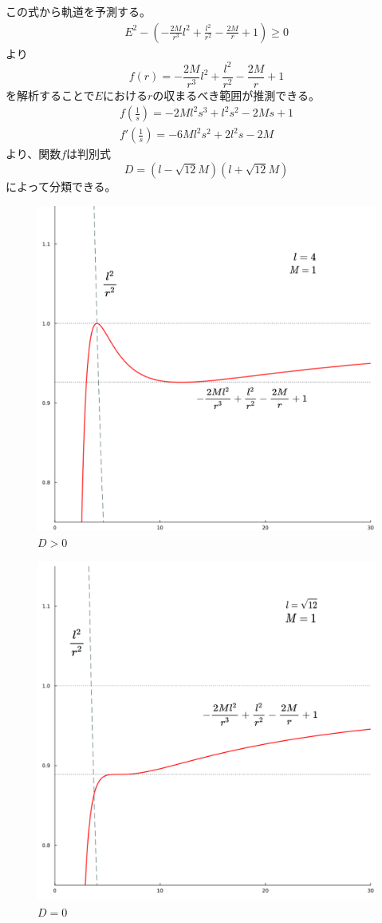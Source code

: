 \documentclass[dvipdfmx]{report} %
\begin{document}
\noindent
この式から軌道を予測する。\\
\begin{equation*}
\begin{split}
E^2 - \left( - \frac{2M}{r^3} l^2 + \frac{l^2}{r^2} - \frac{2M}{r} + 1 \right) \geq 0
\end{split}
\end{equation*}
より
\[f(r) = - \frac{2M}{r^3} l^2 + \frac{l^2}{r^2} - \frac{2M}{r} + 1\]
を解析することで$E$における$r$の収まるべき範囲が推測できる。\\
\begin{equation*}
\begin{split}
f \left( \frac{1}{s} \right) = - 2M l^2 s^3 + l^2 s^2 - 2M s + 1\\
f' \left( \frac{1}{s} \right) = - 6M l^2 s^2 + 2 l^2 s - 2M
\end{split}
\end{equation*}
より、関数$f$は判別式
\[D= \left( l - \sqrt{12}M \right) \left( l + \sqrt{12}M \right) \]
によって分類できる。
\begin{figure}[H]
    \centering
    \includegraphics[width=0.5\columnwidth]{./images/schwarzschild/01.png}
    \caption{$D>0$}
    \label{01}
\end{figure}
\begin{figure}[H]
    \centering
    \includegraphics[width=0.5\columnwidth]{./images/schwarzschild/02.png}
    \caption{$D=0$}
    \label{02}
\end{figure}
\end{document}
